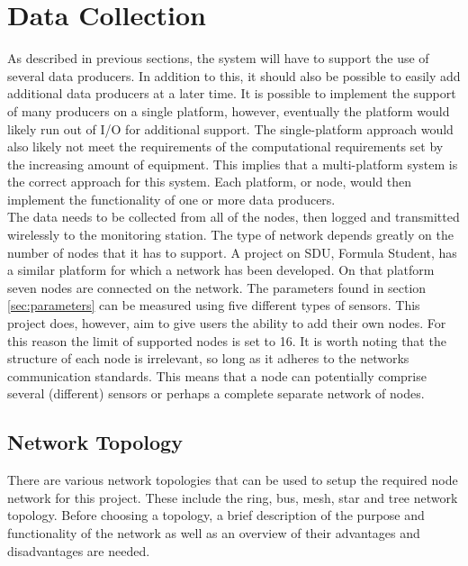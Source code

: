 
\section{Data Collection}
\label{sec:data_collection}
As described in previous sections, the system will have to support the use of several data producers.
In addition to this, it should also be possible to easily add additional data producers at a later time.
It is possible to implement the support of many producers on a single platform, however, eventually the platform would likely run out of I/O for additional support.
The single-platform approach would also likely not meet the requirements of the computational requirements set by the increasing amount of equipment.
This implies that a multi-platform system is the correct approach for this system.
Each platform, or node, would then implement the functionality of one or more data producers.\\
The data needs to be collected from all of the nodes, then logged and transmitted wirelessly to the monitoring station.
The type of network depends greatly on the number of nodes that it has to support.
A project on SDU, Formula Student, has a similar platform for which a network has been developed.
On that platform seven nodes are connected on the network.
The parameters found in section \ref{sec:parameters} can be measured using five different types of sensors.
This project does, however, aim to give users the ability to add their own nodes.
For this reason the limit of supported nodes is set to 16.
It is worth noting that the structure of each node is irrelevant, so long as it adheres to the networks communication standards.
This means that a node can potentially comprise several (different) sensors or perhaps a complete separate network of nodes.

\subsection{Network Topology}

There are various network topologies that can be used to setup the required node network for this project.
These include the ring, bus, mesh, star and tree network topology. 
Before choosing a topology, a brief description of the purpose and functionality of the network as well as an overview of their advantages and disadvantages are needed. 
